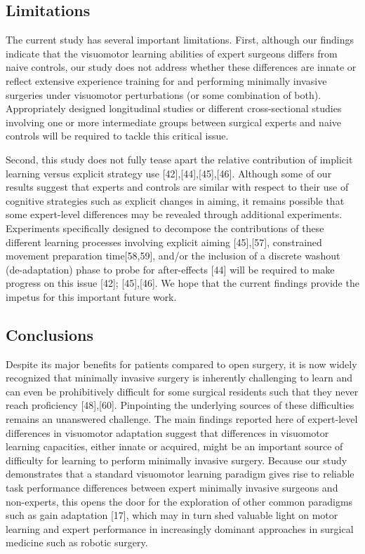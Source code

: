 \documentclass[jou, apacite, 11pt, longtable, floatsintext, notab]{apa6}
\begin{document}
\subsection{Limitations}
The current study has several important limitations. First,
although our findings indicate that the visuomotor learning
abilities of expert surgeons differs from naive controls,
our study does not address whether these differences are
innate or reflect extensive experience training for and
performing minimally invasive surgeries under visuomotor
perturbations (or some combination of both). Appropriately
designed longitudinal studies or different cross-sectional
studies involving one or more intermediate groups between
surgical experts and naive controls will be required to
tackle this critical issue.

Second, this study does not fully tease apart the relative
contribution of implicit learning versus explicit strategy
use [42],[44],[45],[46]. Although some of our results
suggest that experts and controls are similar with respect
to their use of cognitive strategies such as explicit
changes in aiming, it remains possible that some
expert-level differences may be revealed through additional
experiments. Experiments specifically designed to decompose
the contributions of these different learning processes
involving explicit aiming [45],[57], constrained movement
preparation time[58,59], and/or the inclusion of a discrete
washout (de-adaptation) phase to probe for after-effects
[44] will be required to make progress on this issue [42];
[45],[46]. We hope that the current findings provide the
impetus for this important future work.

\subsection{Conclusions}
Despite its major benefits for patients compared to open
surgery, it is now widely recognized that minimally invasive
surgery is inherently challenging to learn and can even be
prohibitively difficult for some surgical residents such
that they never reach proficiency [48],[60]. Pinpointing the
underlying sources of these difficulties remains an
unanswered challenge. The main findings reported here of
expert-level differences in visuomotor adaptation suggest
that differences in visuomotor learning capacities, either
innate or acquired, might be an important source of
difficulty for learning to perform minimally invasive
surgery. Because our study demonstrates that a standard
visuomotor learning paradigm gives rise to reliable task
performance differences between expert minimally invasive
surgeons and non-experts, this opens the door for the
exploration of other common paradigms such as gain
adaptation [17], which may in turn shed valuable light on
motor learning and expert performance in increasingly
dominant approaches in surgical medicine such as robotic
surgery.


\end{document}
